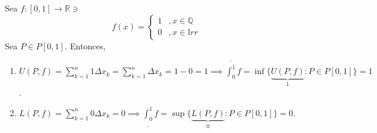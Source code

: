 \begin{ejemplo}
	Sea $f:[0,1]\to\mathbb{R}\ni$
	$$f(x)=\begin{cases}
		1&, x\in\mathbb{Q}\\
		0&, x\in \mathbb{I}rr
	\end{cases}$$
Sea $P\in P[0,1]$. Entonces, 
\begin{enumerate}
	\item $U(P,f)=\sum_{k=1}^{n}1\Delta x_k=\sum_{k=1}^{n}\Delta x_k=1-0=1\implies \overline{\int_0^1}f=\inf\{\underbrace{U(P,f)}_1:P\in P[0,1]\}=1$.
	\item $L(P,f)=\sum_{k=1}^{n}0\Delta x_k=0\implies \underline{\int_0^1}f=\sup\{\underbrace{L(P,f)}_0:P\in P[0,1]\}=0$. 
\end{enumerate}
\end{ejemplo}
